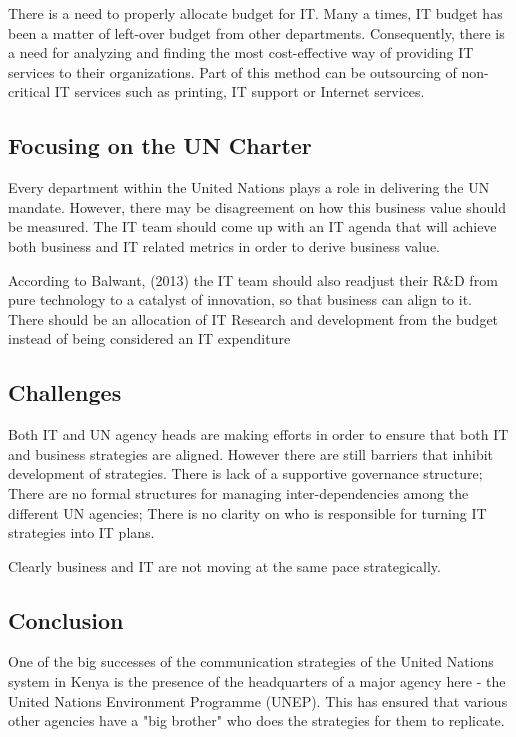 \documentclass[12pt]{article}
\begin{document}
There is a need to properly allocate budget for IT. Many a times, IT budget has been a matter of left-over budget from other departments. Consequently, there is a need for analyzing and finding the most cost-effective way of providing IT services to their organizations. Part of this method can be outsourcing of non-critical IT services such as printing, IT support or Internet services.

\subsection*{Focusing on the UN Charter}
Every department within the United Nations plays a role in delivering the UN mandate. However, there may be disagreement on how this business value should be measured. The IT team should come up with an IT agenda that will achieve both business and IT related metrics in order to derive business value. 

According to Balwant, (2013) the IT team should also readjust their R\&D from pure technology to a catalyst of innovation, so that business can align to it.  There should be an allocation of IT Research and development from the budget instead of being considered an IT expenditure



\subsection*{Challenges}
Both IT and UN agency heads are making efforts in order to ensure that both IT and business strategies are aligned. However there are still barriers that inhibit development of strategies. There is lack of a supportive governance structure; There are no formal structures for managing inter-dependencies among the different UN agencies; There is no clarity on who is responsible for turning IT strategies into IT plans.

Clearly business and IT are not moving at the same pace strategically.


\subsection*{Conclusion}
One of the big successes of the communication strategies of the United Nations system in Kenya is the presence of the headquarters of a major agency here - the United Nations Environment Programme (UNEP). This has ensured that various other agencies have a "big brother"  who does the strategies for them to replicate. 
\end{document}
